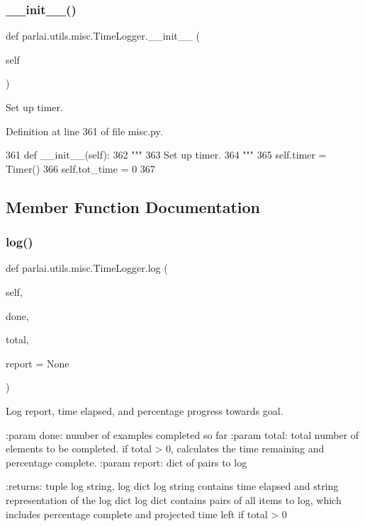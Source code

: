 \subsubsection{\texorpdfstring{\+\_\+\+\_\+init\+\_\+\+\_\+()}{\_\_init\_\_()}}
{\footnotesize\ttfamily def parlai.\+utils.\+misc.\+Time\+Logger.\+\_\+\+\_\+init\+\_\+\+\_\+ (\begin{DoxyParamCaption}\item[{}]{self }\end{DoxyParamCaption})}

\begin{DoxyVerb}Set up timer.
\end{DoxyVerb}
 

Definition at line 361 of file misc.\+py.


\begin{DoxyCode}
361     \textcolor{keyword}{def }\_\_init\_\_(self):
362         \textcolor{stringliteral}{"""}
363 \textcolor{stringliteral}{        Set up timer.}
364 \textcolor{stringliteral}{        """}
365         self.timer = Timer()
366         self.tot\_time = 0
367 
\end{DoxyCode}


\subsection{Member Function Documentation}
\mbox{\label{classparlai_1_1utils_1_1misc_1_1TimeLogger_a52458d882781ad6a6cbcea479ff495de}} 
\subsubsection{\texorpdfstring{log()}{log()}}
{\footnotesize\ttfamily def parlai.\+utils.\+misc.\+Time\+Logger.\+log (\begin{DoxyParamCaption}\item[{}]{self,  }\item[{}]{done,  }\item[{}]{total,  }\item[{}]{report = {\ttfamily None} }\end{DoxyParamCaption})}

\begin{DoxyVerb}Log report, time elapsed, and percentage progress towards goal.

:param done: number of examples completed so far
:param total: total number of elements to be completed. if total > 0,
      calculates the time remaining and percentage complete.
:param report: dict of pairs to log

:returns: tuple log string, log dict
    log string contains time elapsed and string representation of
    the log dict
    log dict contains pairs of all items to log, which includes
    percentage complete and projected time left if total > 0
\end{DoxyVerb}
 

